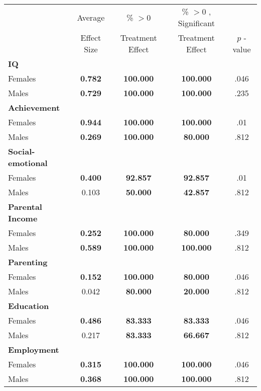 \begin{tabular}{l c c c c}
\toprule
 & Average & \% $ >0 $ & \% $ >0 $ , Significant & \citet{Rosenbaum_2005_Distribution_JRSS} \\
 & Effect Size & Treatment Effect & Treatment Effect & $ p $ -value \\
\midrule
\textbf{IQ} & & & & \\
\quad Females &  \textbf{    0.782} & \textbf{  100.000} & \textbf{  100.000} & .046 \\
\quad Males &  \textbf{    0.729} & \textbf{  100.000} & \textbf{  100.000} & .235 \\
\midrule
\textbf{Achievement} & & & & \\
\quad Females &  \textbf{    0.944} & \textbf{  100.000} & \textbf{  100.000} & .01 \\
\quad Males &  \textbf{    0.269} & \textbf{  100.000} & \textbf{   80.000} & .812 \\
\midrule
\textbf{Social-emotional} & & & & \\
\quad Females &  \textbf{    0.400} & \textbf{   92.857} & \textbf{   92.857} & .01 \\
\quad Males &      0.103 & \textbf{   50.000} & \textbf{   42.857} & .812 \\
\midrule
\textbf{Parental Income} & & & & \\
\quad Females &  \textbf{    0.252} & \textbf{  100.000} & \textbf{   80.000} & .349 \\
\quad Males &  \textbf{    0.589} & \textbf{  100.000} & \textbf{  100.000} & .812 \\
\midrule
\textbf{Parenting} & & & & \\
\quad Females &  \textbf{    0.152} & \textbf{  100.000} & \textbf{   80.000} & .046 \\
\quad Males &      0.042 & \textbf{   80.000} & \textbf{   20.000} & .812 \\
\midrule
\textbf{Education} & & & & \\
\quad Females &  \textbf{    0.486} & \textbf{   83.333} & \textbf{   83.333} & .046 \\
\quad Males &      0.217 & \textbf{   83.333} & \textbf{   66.667} & .812 \\
\midrule
\textbf{Employment} & & & & \\
\quad Females &  \textbf{    0.315} & \textbf{  100.000} & \textbf{  100.000} & .046 \\
\quad Males &  \textbf{    0.368} & \textbf{  100.000} & \textbf{  100.000} & .812 \\

\end{tabular}
